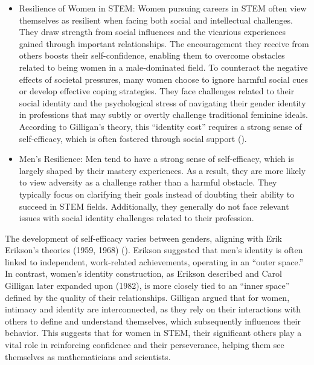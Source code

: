 \begin{itemize}
    \item Resilience of Women in STEM: Women pursuing careers in STEM often view themselves as resilient when facing both social and intellectual challenges. They draw strength from social influences and the vicarious experiences gained through important relationships. The encouragement they receive from others boosts their self-confidence, enabling them to overcome obstacles related to being women in a male-dominated field. To counteract the negative effects of societal pressures, many women choose to ignore harmful social cues or develop effective coping strategies. They face challenges related to their social identity and the psychological stress of navigating their gender identity in professions that may subtly or overtly challenge traditional feminine ideals. According to Gilligan's theory, this ``identity cost'' requires a strong sense of self-efficacy, which is often fostered through social support (\cite{Gilligan1993}).
    \item Men's Resilience: Men tend to have a strong sense of self-efficacy, which is largely shaped by their mastery experiences. As a result, they are more likely to view adversity as a challenge rather than a harmful obstacle. They typically focus on clarifying their goals instead of doubting their ability to succeed in STEM fields. Additionally, they generally do not face relevant issues with social identity challenges related to their profession.
\end{itemize}
The development of self-efficacy varies between genders, aligning with Erik Erikson's theories (1959, 1968) (\cite{Zel}). Erikson suggested that men's identity is often linked to independent, work-related achievements, operating in an ``outer space.'' In contrast, women's identity construction, as Erikson described and Carol Gilligan later expanded upon (1982), is more closely tied to an ``inner space'' defined by the quality of their relationships. Gilligan argued that for women, intimacy and identity are interconnected, as they rely on their interactions with others to define and understand themselves, which subsequently influences their behavior. This suggests that for women in STEM, their significant others play a vital role in reinforcing confidence and their perseverance, helping them see themselves as mathematicians and scientists.

